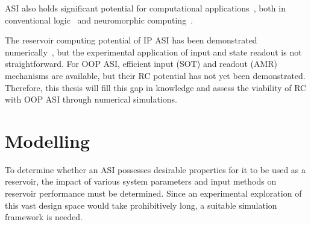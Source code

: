 ASI also holds significant potential for computational applications~\cite{heyderman2022spin}, both in conventional logic~\cite{ComputationalLogic_2018,Gypens_Balanced,EngineeringRelaxationComputation} and neuromorphic computing~\cite{ASI_computation,RC_RecentAdvances}. \par
The reservoir computing potential of IP ASI has been demonstrated numerically~\cite{RC_ASI}, but the experimental application of input and state readout is not straightforward.
For OOP ASI, efficient input (SOT) and readout (AMR) mechanisms are available, but their RC potential has not yet been demonstrated.
Therefore, this thesis will fill this gap in knowledge and assess the viability of RC with OOP ASI through numerical simulations.

\newpage
\section{Modelling}\label{sec:1:Modelling}
To determine whether an ASI possesses desirable properties for it to be used as a reservoir, the impact of various system parameters and input methods on reservoir performance must be determined.
Since an experimental exploration of this vast design space would take prohibitively long, a suitable simulation framework is needed.

